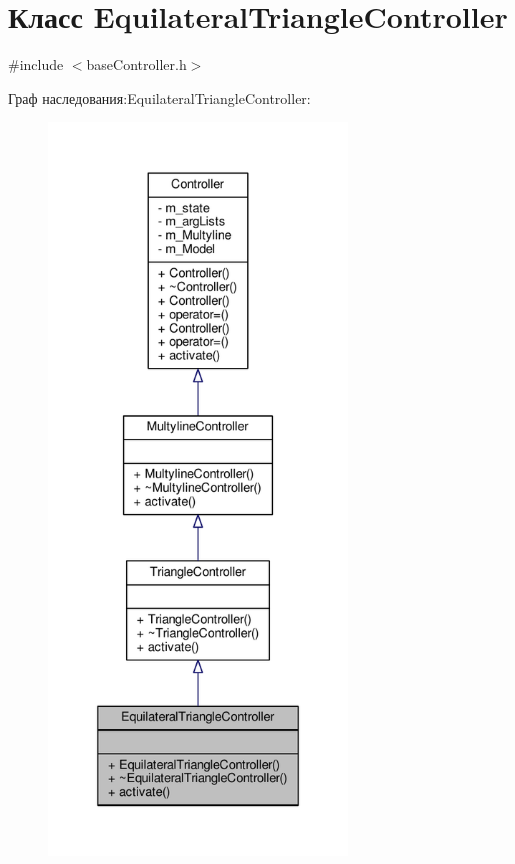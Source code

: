\hypertarget{class_equilateral_triangle_controller}{\section{Класс Equilateral\-Triangle\-Controller}
\label{class_equilateral_triangle_controller}
}


{\ttfamily \#include $<$base\-Controller.\-h$>$}



Граф наследования\-:Equilateral\-Triangle\-Controller\-:
\nopagebreak
\begin{figure}[H]
\begin{center}
\leavevmode
\includegraphics[height=550pt]{class_equilateral_triangle_controller__inherit__graph}
\end{center}
\end{figure}


